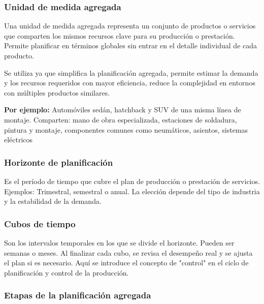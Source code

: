 \documentclass[a4paper,oneside,11pt]{article}
\begin{document}
\subsubsection{Unidad de medida agregada}

Una unidad de medida agregada representa un conjunto de productos o servicios que comparten los mismos recursos clave para su producción o prestación. Permite planificar en términos globales sin entrar en el detalle individual de cada producto.

Se utiliza ya que simplifica la planificación agregada, permite estimar la demanda y los recursos requeridos con mayor eficiencia, reduce la complejidad en entornos con múltiples productos similares.

\textbf{Por ejemplo:} Automóviles sedán, hatchback y SUV de una misma línea de montaje. Comparten: mano de obra especializada, estaciones de soldadura, pintura y montaje, componentes comunes como neumáticos, asientos, sistemas eléctricos

\subsubsection{Horizonte de planificación}

Es el período de tiempo que cubre el plan de producción o prestación de servicios.
Ejemplos: Trimestral, semestral o anual.
La elección depende del tipo de industria y la estabilidad de la demanda.

\subsubsection{Cubos de tiempo}

Son los intervalos temporales en los que se divide el horizonte. Pueden ser semanas o meses. Al finalizar cada cubo, se revisa el desempeño real y se ajusta el plan si es necesario. Aquí se introduce el concepto de "control" en el ciclo de planificación y control de la producción.

\subsubsection{Etapas de la planificación agregada}
\end{document}
